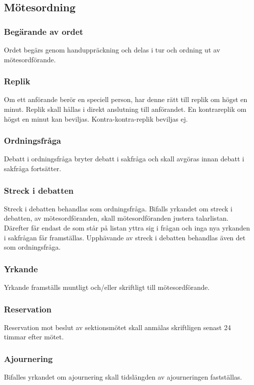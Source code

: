\subsection{Mötesordning}
\subsubsection{Begärande av ordet}
Ordet begärs genom handuppräckning och delas i tur och ordning ut av
mötesordförande.
  
\subsubsection{Replik}
Om ett anförande berör en speciell person, har denne rätt till replik om högst
en minut. Replik skall hållas i direkt anslutning till anförandet. En kontrareplik
om högst en minut kan beviljas. Kontra-kontra-replik beviljas ej.
 
\subsubsection{Ordningsfråga}
Debatt i ordningsfråga bryter debatt i sakfråga och skall avgöras innan debatt
i sakfråga fortsätter.

\subsubsection{Streck i debatten}
Streck i debatten behandlas som ordningsfråga. Bifalls yrkandet om streck i debatten, av mötesordföranden, skall mötesordföranden justera talarlistan. Därefter får endast de som står på listan yttra sig i frågan och inga nya yrkanden i sakfrågan får framställas. Upphävande av streck i debatten behandlas även det som ordningsfråga.
 
\subsubsection{Yrkande}
Yrkande framställs muntligt och/eller skriftligt till mötesordförande.

\subsubsection{Reservation}
Reservation mot beslut av sektionsmötet skall anmälas skriftligen senast 24 timmar efter mötet.
 
\subsubsection{Ajournering}
Bifalles yrkandet om ajournering skall tidslängden av ajourneringen fastställas.

